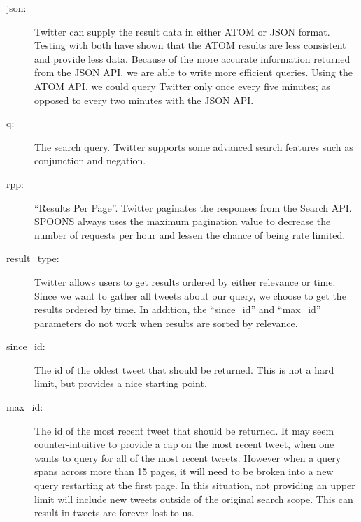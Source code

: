 \documentclass[12pt]{ucthesis}
\begin{document}
\begin{description}

\item[json:]
Twitter can supply the result data in either ATOM or JSON format. Testing with both have shown that the ATOM
results are less consistent and provide less data. Because of the more accurate information returned from the JSON
API, we are able to write more efficient queries. Using the ATOM API, we could query Twitter only once every five
minutes; as opposed to every two minutes with the JSON API.

\item[q:]
The search query. Twitter supports some advanced search features such as conjunction and negation.

\item[rpp:]
``Results Per Page''. Twitter paginates the responses from the Search API. SPOONS always uses the maximum pagination value to decrease the number of requests per hour and lessen the chance of being rate limited.

\item[result\_type:]
Twitter allows users to get results ordered by either relevance or time. Since we want to gather all tweets about
our query, we choose to get the results ordered by time. In addition, the ``since\_id'' and ``max\_id''
parameters do not work when results are sorted by relevance.

\item[since\_id:]
The id of the oldest tweet that should be returned. This is not a hard limit, but provides a nice starting point.

\item[max\_id:]
The id of the most recent tweet that should be returned. It may seem counter-intuitive to provide a cap on the
most recent tweet, when one wants to query for all of the most recent tweets. However when a query spans across
more than 15 pages, it will need to be broken into a new query restarting at the first page. In this situation,
not providing an upper limit will include new tweets outside of the original search scope. This can result in tweets
are forever lost to us.

\end{description}
\end{document}
